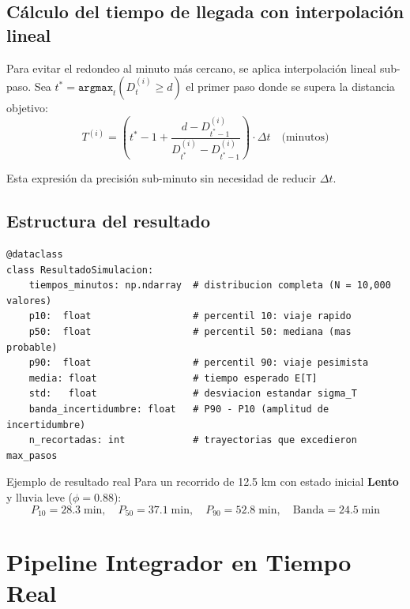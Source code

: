\documentclass[12pt, a4paper]{article}
\theoremstyle{definition}
\begin{document}
\subsection{Cálculo del tiempo de llegada con interpolación lineal}

Para evitar el redondeo al minuto más cercano, se aplica interpolación lineal
sub-paso. Sea $t^* = \texttt{argmax}_{t}(D^{(i)}_t \geq d)$ el primer paso
donde se supera la distancia objetivo:
\begin{equation}
    T^{(i)} = \left(t^* - 1 + \frac{d - D^{(i)}_{t^*-1}}{D^{(i)}_{t^*} - D^{(i)}_{t^*-1}}\right)
              \cdot \Delta t \quad \text{(minutos)}
    \label{eq:interpolation}
\end{equation}

Esta expresión da precisión sub-minuto sin necesidad de reducir $\Delta t$.

\subsection{Estructura del resultado}

\begin{lstlisting}[caption={Dataclass \texttt{ResultadoSimulacion}: salida completa del motor.}]
@dataclass
class ResultadoSimulacion:
    tiempos_minutos: np.ndarray  # distribucion completa (N = 10,000 valores)
    p10:  float                  # percentil 10: viaje rapido
    p50:  float                  # percentil 50: mediana (mas probable)
    p90:  float                  # percentil 90: viaje pesimista
    media: float                 # tiempo esperado E[T]
    std:   float                 # desviacion estandar sigma_T
    banda_incertidumbre: float   # P90 - P10 (amplitud de incertidumbre)
    n_recortadas: int            # trayectorias que excedieron max_pasos
\end{lstlisting}

\begin{cajaresultado}{Ejemplo de resultado real}
Para un recorrido de 12.5 km con estado inicial \textbf{Lento} y
lluvia leve ($\phi = 0.88$):
\[
P_{10} = 28.3\;\text{min}, \quad
P_{50} = 37.1\;\text{min}, \quad
P_{90} = 52.8\;\text{min}, \quad
\text{Banda} = 24.5\;\text{min}
\]
\end{cajaresultado}

\section{Pipeline Integrador en Tiempo Real}
\label{sec:pipeline}
\end{document}
